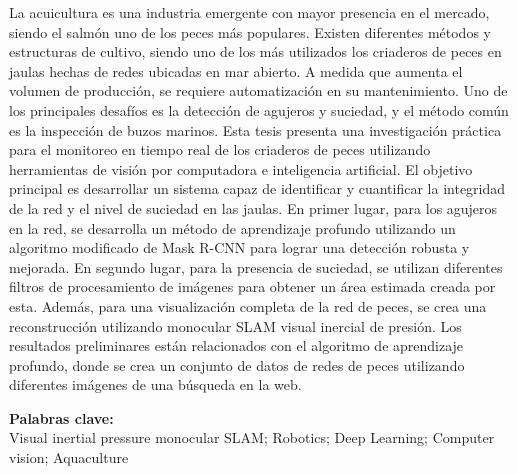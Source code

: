 
La acuicultura es una industria emergente con mayor presencia en el mercado, siendo el salmón uno de los peces más populares. Existen diferentes métodos y estructuras de cultivo, siendo uno de los más utilizados los criaderos de peces en jaulas hechas de redes ubicadas en mar abierto. A medida que aumenta el volumen de producción, se requiere automatización en su mantenimiento. Uno de los principales desafíos es la detección de agujeros y suciedad, y el método común es la inspección de buzos marinos. Esta tesis presenta una investigación práctica para el monitoreo en tiempo real de los criaderos de peces utilizando herramientas de visión por computadora e inteligencia artificial. El objetivo principal es desarrollar un sistema capaz de identificar y cuantificar la integridad de la red y el nivel de suciedad en las jaulas. En primer lugar, para los agujeros en la red, se desarrolla un método de aprendizaje profundo utilizando un algoritmo modificado de Mask R-CNN para lograr una detección robusta y mejorada. En segundo lugar, para la presencia de suciedad, se utilizan diferentes filtros de procesamiento de imágenes para obtener un área estimada creada por esta. Además, para una visualización completa de la red de peces, se crea una reconstrucción utilizando monocular SLAM visual inercial de presión. Los resultados preliminares están relacionados con el algoritmo de aprendizaje profundo, donde se crea un conjunto de datos de redes de peces utilizando diferentes imágenes de una búsqueda en la web.


\noindent \textbf{Palabras clave:}\\
\noindent  Visual inertial pressure monocular SLAM; Robotics; Deep Learning; Computer vision; Aquaculture